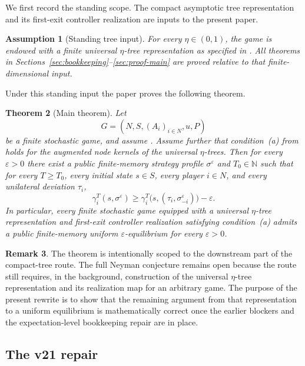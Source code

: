 \documentclass[12pt]{article}
\newtheorem{theorem}{Theorem}[section]
\newtheorem{assumption}[theorem]{Assumption}
\theoremstyle{definition}
\newtheorem{remark}[theorem]{Remark}
\newcommand{\eps}{\varepsilon}
\newcommand{\N}{\mathbb{N}}
\newcommand{\1}{\mathbf{1}}
\begin{document}
We first record the standing scope. The compact asymptotic tree representation and
its first-exit controller realization are inputs to the present paper.

\begin{assumption}[Standing tree input]
\label{ass:tree-input}
For every $\eta\in(0,1)$, the game is endowed with a finite universal
$\eta$-tree representation as specified in
. All theorems in
Sections~\ref{sec:bookkeeping}--\ref{sec:proof-main} are proved relative to that
finite-dimensional input.
\end{assumption}

Under this standing input the paper proves the following theorem.

\begin{theorem}[Main theorem]
\label{thm:main}
Let
\[
G=(N,S,(A_i)_{i\in N},u,P)
\]
be a finite stochastic game, and assume . Assume further
that condition~\textnormal{(a)} from  holds for the augmented node
kernels of the universal $\eta$-trees. Then for every $\eps>0$ there exist a
public finite-memory strategy profile $\sigma^\eps$ and $T_0\in\N$ such that for
every $T\ge T_0$, every initial state $s\in S$, every player $i\in N$, and every
unilateral deviation $\tau_i$,
\[
\gamma_i^T(s,\sigma^\eps)
\ge
\gamma_i^T\bigl(s,(\tau_i,\sigma^\eps_{-i})\bigr)-\eps.
\]
In particular, every finite stochastic game equipped with a universal
$\eta$-tree representation and first-exit controller realization satisfying
condition~\textnormal{(a)} admits a public finite-memory uniform
$\eps$-equilibrium for every $\eps>0$.
\end{theorem}

\begin{remark}
The theorem is intentionally scoped to the downstream part of the compact-tree
route. The full Neyman conjecture remains open because the route still requires,
in the background, construction of the universal $\eta$-tree representation and
its realization map for an arbitrary game. The purpose of the present rewrite is
to show that the remaining argument from that representation to a uniform
equilibrium is mathematically correct once the earlier blockers and the
expectation-level bookkeeping repair are in place.
\end{remark}




\subsection{The v21 repair}
\end{document}

